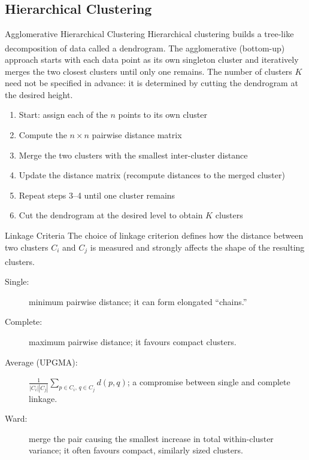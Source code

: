\subsection{Hierarchical Clustering}

\begin{v3topic}{Agglomerative Hierarchical Clustering}
    Hierarchical clustering builds a tree-like decomposition of data called a dendrogram\textsuperscript{\cite[][p.457]{hanDataMiningConcepts2012}}. The agglomerative (bottom-up) approach starts with each data point as its own singleton cluster and iteratively merges the two closest clusters until only one remains. The number of clusters $K$ need not be specified in advance: it is determined by cutting the dendrogram at the desired height.
\visualseparator
    \begin{enumerate}
        \item Start: assign each of the $n$ points to its own cluster
        \item Compute the $n \times n$ pairwise distance matrix
        \item Merge the two clusters with the smallest inter-cluster distance
        \item Update the distance matrix (recompute distances to the merged cluster)
        \item Repeat steps 3--4 until one cluster remains
        \item Cut the dendrogram at the desired level to obtain $K$ clusters
    \end{enumerate}

\end{v3topic}
\begin{v3topic}{Linkage Criteria}
    The choice of linkage criterion defines how the distance between two clusters $C_i$ and $C_j$ is measured and strongly affects the shape of the resulting clusters\textsuperscript{\cite[][pp.~460--463]{hanDataMiningConcepts2012}}.
\visualseparator
    \begin{description}
        \item[Single:] minimum pairwise distance; it can form elongated
        ``chains.''
        \item[Complete:] maximum pairwise distance; it favours compact
        clusters.
        \item[Average (UPGMA):]
        $\frac{1}{|C_i||C_j|}\sum_{p\in C_i,\,q\in C_j}d(p,q)$; a compromise
        between single and complete linkage.
        \item[Ward:] merge the pair causing the smallest increase in total
        within-cluster variance; it often favours compact, similarly sized
        clusters.
    \end{description}

\end{v3topic}
